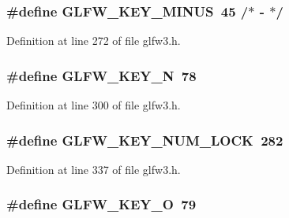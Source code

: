 \subsubsection[{G\+L\+F\+W\+\_\+\+K\+E\+Y\+\_\+\+M\+I\+N\+U\+S}]{\setlength{\rightskip}{0pt plus 5cm}\#define G\+L\+F\+W\+\_\+\+K\+E\+Y\+\_\+\+M\+I\+N\+U\+S~45  /$\ast$ -\/ $\ast$/}\label{group__keys_gac556b360f7f6fca4b70ba0aecf313fd4}


Definition at line 272 of file glfw3.\+h.

\hypertarget{group__keys_gae00856dfeb5d13aafebf59d44de5cdda}{}
\subsubsection[{G\+L\+F\+W\+\_\+\+K\+E\+Y\+\_\+\+N}]{\setlength{\rightskip}{0pt plus 5cm}\#define G\+L\+F\+W\+\_\+\+K\+E\+Y\+\_\+\+N~78}\label{group__keys_gae00856dfeb5d13aafebf59d44de5cdda}


Definition at line 300 of file glfw3.\+h.

\hypertarget{group__keys_ga3946edc362aeff213b2be6304296cf43}{}
\subsubsection[{G\+L\+F\+W\+\_\+\+K\+E\+Y\+\_\+\+N\+U\+M\+\_\+\+L\+O\+C\+K}]{\setlength{\rightskip}{0pt plus 5cm}\#define G\+L\+F\+W\+\_\+\+K\+E\+Y\+\_\+\+N\+U\+M\+\_\+\+L\+O\+C\+K~282}\label{group__keys_ga3946edc362aeff213b2be6304296cf43}


Definition at line 337 of file glfw3.\+h.

\hypertarget{group__keys_gaecbbb79130df419d58dd7f09a169efe9}{}
\subsubsection[{G\+L\+F\+W\+\_\+\+K\+E\+Y\+\_\+\+O}]{\setlength{\rightskip}{0pt plus 5cm}\#define G\+L\+F\+W\+\_\+\+K\+E\+Y\+\_\+\+O~79}\label{group__keys_gaecbbb79130df419d58dd7f09a169efe9}


